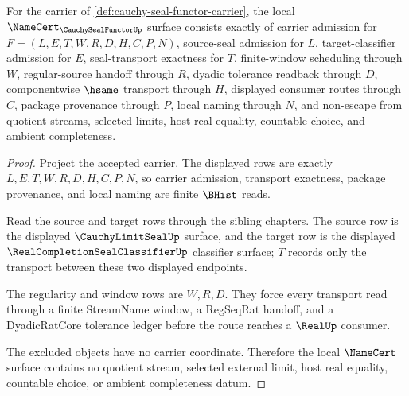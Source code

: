\begin{theorem}
\label{thm:cauchy-seal-functor-namecert-obligations}
For the carrier of \autoref{def:cauchy-seal-functor-carrier}, the local $\NameCert_{\CauchySealFunctorUp}$ surface consists exactly of carrier admission for $F=(L,E,T,W,R,D,H,C,P,N)$, source-seal admission for $L$, target-classifier admission for $E$, seal-transport exactness for $T$, finite-window scheduling through $W$, regular-source handoff through $R$, dyadic tolerance readback through $D$, componentwise $\hsame$ transport through $H$, displayed consumer routes through $C$, package provenance through $P$, local naming through $N$, and non-escape from quotient streams, selected limits, host real equality, countable choice, and ambient completeness.
\end{theorem}
\begin{proof}
Project the accepted carrier. The displayed rows are exactly $L,E,T,W,R,D,H,C,P,N$, so carrier admission, transport exactness, package provenance, and local naming are finite $\BHist$ reads.

Read the source and target rows through the sibling chapters. The source row is the displayed $\CauchyLimitSealUp$ surface, and the target row is the displayed $\RealCompletionSealClassifierUp$ classifier surface; $T$ records only the transport between these two displayed endpoints.

The regularity and window rows are $W,R,D$. They force every transport read through a finite StreamName window, a RegSeqRat handoff, and a DyadicRatCore tolerance ledger before the route reaches a $\RealUp$ consumer.

The excluded objects have no carrier coordinate. Therefore the local $\NameCert$ surface contains no quotient stream, selected external limit, host real equality, countable choice, or ambient completeness datum.
\end{proof}

